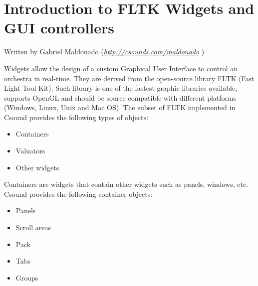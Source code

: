 \begin{comment}
\documentclass[10pt]{article}
\usepackage{fullpage, graphicx, url}
\setlength{\parskip}{1ex}
\setlength{\parindent}{0ex}
\title{Introduction to FLTK Widgets and GUI controllers}



\begin{tabular}{ccc}
The Alternative Csound Reference Manual & & \\
Previous &Instrument Control &Next

\end{tabular}

\end{comment}
\section{Introduction to FLTK Widgets and GUI controllers}


  Written by Gabriel Maldonado (\emph{\url{http://csounds.com/maldonado}}
) 


  Widgets allow the design of a custom Graphical User Interface to control an orchestra in real-time. They are derived from the open-source library FLTK (Fast Light Tool Kit). Such library is one of the fastest graphic libraries available, supports OpenGL and should be source compatible with different platforms (Windows, Linux, Unix and Mac OS). The subset of FLTK implemented in Csound provides the following types of objects: 


 
\begin{itemize}
\item 

 Containers

\item 

 Valuators

\item 

 Other widgets


\end{itemize}


  Containers are widgets that contain other widgets such as panels, windows, etc. Csound provides the following container objects: 


 
\begin{itemize}
\item 

 Panels

\item 

 Scroll areas

\item 

 Pack

\item 

 Tabs

\item 

 Groups


\end{itemize}


